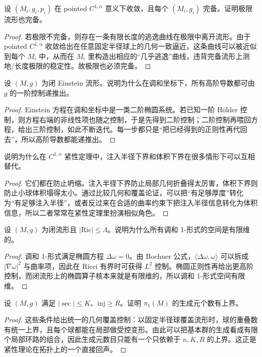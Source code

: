 \documentclass[11pt,a4paper,openany]{ctexbook}
\numberwithin{equation}{chapter}
\begin{document}
\begin{exercise}
设 \((M_i,g_i,p_i)\) 在 pointed \(C^{1,\alpha}\) 意义下收敛，且每个 \((M_i,g_i)\) 完备。证明极限流形也完备。
\end{exercise}
\begin{proof}
若极限不完备，则存在一条有限长度的逃逸曲线在极限中离开流形。由于 pointed \(C^{1,\alpha}\) 收敛给出在任意固定半径球上的几何一致逼近，这条曲线可以被近似到每个 \(M_i\) 中，从而在 \(M_i\) 里构造出相应的“几乎逃逸”曲线，违背完备流形上测地/长度极限的稳定性。故极限也必须完备。  
\end{proof}

\begin{exercise}
设 \((M,g)\) 为闭 Einstein 流形。说明为什么在调和坐标下，所有高阶导数都可由 \(g\) 的一阶控制递推出。
\end{exercise}
\begin{proof}
Einstein 方程在调和坐标中是一类二阶椭圆系统。若已知一阶 Hölder 控制，则方程右端的非线性项也随之控制，于是先得到二阶控制；二阶控制再喂回方程，给出三阶控制，如此不断迭代。每一步都只是“把已经得到的正则性再代回去”，所以高阶导数都能递推出。  
\end{proof}

\begin{exercise}
说明为什么在 \(C^{1,\alpha}\) 紧性定理中，注入半径下界和体积下界在很多情形下可以互相替代。
\end{exercise}
\begin{proof}
它们都在防止坍缩。注入半径下界防止局部几何折叠得太厉害，体积下界则防止小球体积塌得太小。通过比较几何和覆盖论证，可以把“有足够厚度”转化为“有足够注入半径”，或者反过来在合适的曲率约束下把注入半径信息转化为体积信息，所以二者常常在紧性定理里扮演相似角色。  
\end{proof}

\begin{exercise}
设 \((M,g)\) 为闭流形且 \(|\mathrm{Ric}|\le \Lambda\)。说明为什么所有调和 1-形式的空间是有限维的。
\end{exercise}
\begin{proof}
调和 1-形式满足椭圆方程 \(\Delta\omega=0\)。由 Bochner 公式，\(\langle \Delta\omega,\omega\rangle\) 可以拆成 \(|\nabla\omega|^2\) 与曲率项，因此在 Ricci 有界时可获得 \(L^2\) 控制。椭圆正则性再给出更高阶控制，而闭流形上的椭圆算子核本来就是有限维的，所以调和 1-形式空间有限维。  
\end{proof}

\begin{exercise}
设 \((M,g)\) 满足 \(|\sec|\le K\)、\(\mathrm{inj}\ge R\)。证明 \(\pi_1(M)\) 的生成元个数有上界。
\end{exercise}
\begin{proof}
这些条件给出统一的几何覆盖控制：以固定半径球覆盖流形时，球的重叠数有统一上界，且每个球都能在局部做受控变形。由此可以把基本群的生成看成有限个局部环路的组合，因此生成元数目只能有一个只依赖于 \(n,K,R\) 的上界。这正是紧性理论在拓扑上的一个直接回声。  
\end{proof}
\end{document}
